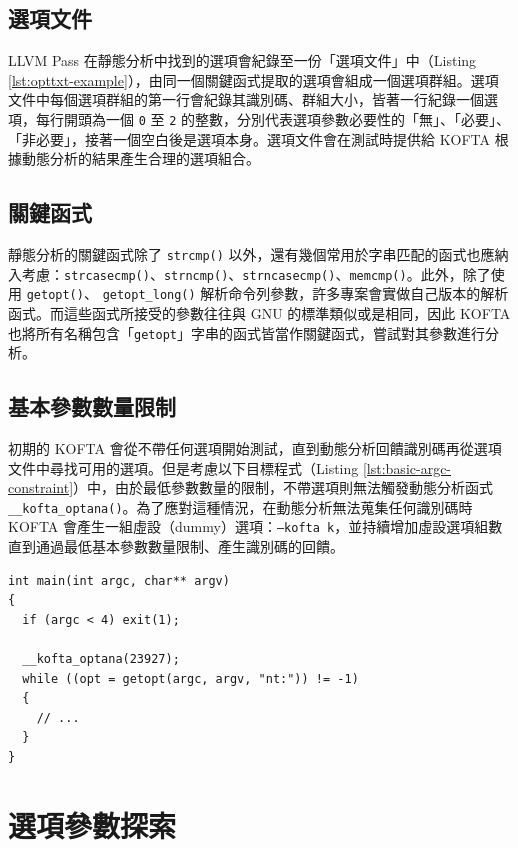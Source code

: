 \subsection{選項文件}

LLVM Pass 在靜態分析中找到的選項會紀錄至一份「選項文件」中（Listing \ref{lst:opttxt-example}），由同一個關鍵函式提取的選項會組成一個選項群組。選項文件中每個選項群組的第一行會紀錄其識別碼、群組大小，皆著一行紀錄一個選項，每行開頭為一個 \texttt{0} 至 \texttt{2} 的整數，分別代表選項參數必要性的「無」、「必要」、「非必要」，接著一個空白後是選項本身。選項文件會在測試時提供給 KOFTA 根據動態分析的結果產生合理的選項組合。

\subsection{關鍵函式}
\label{subsec:optana-key-funcs}

靜態分析的關鍵函式除了 \texttt{strcmp()} 以外，還有幾個常用於字串匹配的函式也應納入考慮：\texttt{strcasecmp()}、\texttt{strncmp()}、\texttt{strncasecmp()}、\texttt{memcmp()}。此外，除了使用 \texttt{getopt()}、 \texttt{getopt\_long()} 解析命令列參數，許多專案會實做自己版本的解析函式。而這些函式所接受的參數往往與 GNU 的標準類似或是相同，因此 KOFTA 也將所有名稱包含「\texttt{getopt}」字串的函式皆當作關鍵函式，嘗試對其參數進行分析。

\subsection{基本參數數量限制}

初期的 KOFTA 會從不帶任何選項開始測試，直到動態分析回饋識別碼再從選項文件中尋找可用的選項。但是考慮以下目標程式（Listing \ref{lst:basic-argc-constraint}）中，由於最低參數數量的限制，不帶選項則無法觸發動態分析函式 \texttt{\_\_kofta\_optana()}。為了應對這種情況，在動態分析無法蒐集任何識別碼時 KOFTA 會產生一組虛設（dummy）選項：\texttt{--kofta k}，並持續增加虛設選項組數直到通過最低基本參數數量限制、產生識別碼的回饋。

\begin{lstlisting}[caption=基本參數數量限制範例, label=lst:basic-argc-constraint]
int main(int argc, char** argv)
{
  if (argc < 4) exit(1);

  __kofta_optana(23927);
  while ((opt = getopt(argc, argv, "nt:")) != -1)
  {
    // ...
  }
}
\end{lstlisting}

\section{選項參數探索}

